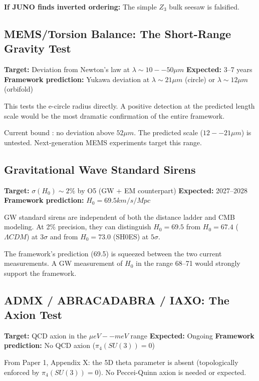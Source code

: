 \documentclass[aps,prd,preprint,superscriptaddress,longbibliography]{revtex4-2}
\begin{document}
\textbf{If JUNO finds inverted ordering:} The simple $Z_{3}$ bulk seesaw is falsified.



\subsection{MEMS/Torsion Balance: The Short-Range Gravity Test}

\textbf{Target:} Deviation from Newton's law at $\lambda \sim  10--50 \mu m$ \textbf{Expected:} 3--7 years \textbf{Framework prediction:} Yukawa deviation at $\lambda \sim  21 \mu m$ (circle) or $\lambda \sim  12 \mu m$ (orbifold)

This tests the e-circle radius directly. A positive detection at the predicted length scale would be the most dramatic confirmation of the entire framework.

Current bound \cite{Leeetal2020}: no deviation above $52 \mu m$. The predicted scale ($12--21 \mu m$) is untested. Next-generation MEMS experiments target this range.



\subsection{Gravitational Wave Standard Sirens}

\textbf{Target:} $\sigma(H_{0}) \sim  2\%$ by O5 (GW + EM counterpart) \textbf{Expected:} 2027--2028 \textbf{Framework prediction:} $H_{0} = 69.5 km/s/Mpc$

GW standard sirens are independent of both the distance ladder and CMB modeling. At 2\% precision, they can distinguish $H_{0} = 69.5$ from $H_{0} = 67.4$ ($\Lambda CDM$) at $3\sigma$ and from $H_{0} = 73.0$ (SH0ES) at $5\sigma$.

The framework's prediction (69.5) is squeezed between the two current measurements. A GW measurement of $H_{0}$ in the range 68--71 would strongly support the framework.



\subsection{ADMX / ABRACADABRA / IAXO: The Axion Test}

\textbf{Target:} QCD axion in the $\mu eV -- meV$ range \textbf{Expected:} Ongoing \textbf{Framework prediction:} No QCD axion ($\pi_{4}(SU(3)) = 0$)

From Paper 1, Appendix X: the 5D theta parameter is absent (topologically enforced by $\pi_{4}(SU(3)) = 0$). No Peccei-Quinn axion is needed or expected.
\end{document}

